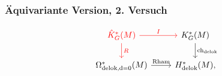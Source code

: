 \documentclass[12pt,utf8,notheorems,compress,t]{beamer}
\renewcommand{\_}{\mathpunct{.}}
\newcommand{\?}{\,{:}\,}
\newcommand{\dd}{\textup{d}}
\begin{document}
\begin{frame}\frametitle{Äquivariante Version, 2. Versuch}
\begin{equation}\begin{tikzcd}[ampersand replacement=\&]
        \textcolor{red}{\hat K_G^*(M)} \arrow[d,
        "R", red]\arrow[r, "I", red] \& K_G^*(M)\arrow[d,
        "\mathrm{ch}_{\mathrm{delok}}"] \\ 
        \Omega^*_{\mathrm{delok}, \dd=0}(M) \arrow[r, "\mathrm{Rham}"]\&
        H_{\mathrm{delok}}^*(M),
\end{tikzcd}\nonumber
\end{equation}


\end{frame}
\end{document}
